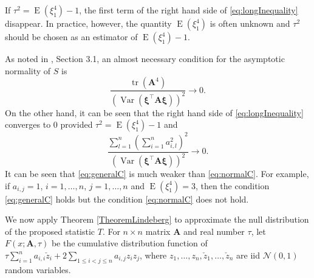 \documentclass[smallextended]{svjour3}       %
\DeclareMathOperator{\mytr}{tr}
\DeclareMathOperator{\myE}{E}
\DeclareMathOperator{\myVar}{Var}
\newcommand{\BA}{\mathbf{A}}    \newcommand{\BB}{\mathbf{B}}    \newcommand{\BC}{\mathbf{C}}    \newcommand{\BD}{\mathbf{D}}    \newcommand{\BE}{\mathbf{E}}    \newcommand{\BF}{\mathbf{F}}    \newcommand{\BG}{\mathbf{G}}    \newcommand{\BH}{\mathbf{H}}    \newcommand{\BI}{\mathbf{I}}    \newcommand{\BJ}{\mathbf{J}}    \newcommand{\BK}{\mathbf{K}}    \newcommand{\BL}{\mathbf{L}}
\newcommand{\bfsym}[1]{\ensuremath{\boldsymbol{#1}}}
\def\bxi{\bfsym {\xi}}
\begin{document}
\begin{remark}\label{remark1}
    If $\tau^2=\myE (\xi_1^4) -1$, the first term of the right hand side of \eqref{eq:longInequality} disappear.
    In practice, however, the quantity $\myE (\xi_1^4)$ is often unknown and
    $\tau^2$ should be chosen as an estimator of $\myE (\xi_1^4)-1$.
\end{remark}

\begin{remark}\label{remark2}
    As noted in \cite{Chatterjee2008}, Section 3.1, an almost necessary condition for the asymptotic normality of $S$ is
    \begin{equation}\label{eq:normalC}
        \frac{\mytr (\BA^4)}{
            \left( 
                \myVar(\bxi^\top \BA \bxi)
            \right)^2
        }\to 0. 
    \end{equation}
    On the other hand, it can be seen that the right hand side of \eqref{eq:longInequality} converges to $0$ provided $\tau^2=\myE (\xi_1^4)-1$ and
    \begin{equation}\label{eq:generalC}
            \frac{
                \sum_{l=1}^n \left( \sum_{i=1}^n a_{i,l}^2 \right)^2
            }{
            \left(
                \myVar(\bxi^\top \BA \bxi)
\right)^{2}
            }
            \to 0.
    \end{equation}
    It can be seen that \eqref{eq:generalC} is much weaker than \eqref{eq:normalC}.
    For example, if $a_{i,j}=1$, $i=1,\ldots, n$, $j=1,\ldots, n$ and $\myE (\xi_1^4)=3$, then the condition \eqref{eq:generalC} holds but the condition \eqref{eq:normalC} does not hold.
\end{remark}


We now apply Theorem \ref{TheoremLindeberg} to approximate the null distribution of the proposed statistic $T$.
For $n\times n$ matrix $\BA$ and real number $\tau$, let $F (x;{\BA,\tau})$ be the cumulative distribution function of $
        \tau \sum_{i=1}^n  a_{i,i}\check z_i
    +2\sum_{1\leq i <j \leq n} a_{i,j} z_i z_j
    $,
    where $z_1,\ldots, z_n, \check z_1, \ldots, \check z_n$ are iid  $\mathcal N(0,1)$ random variables.
\end{document}

